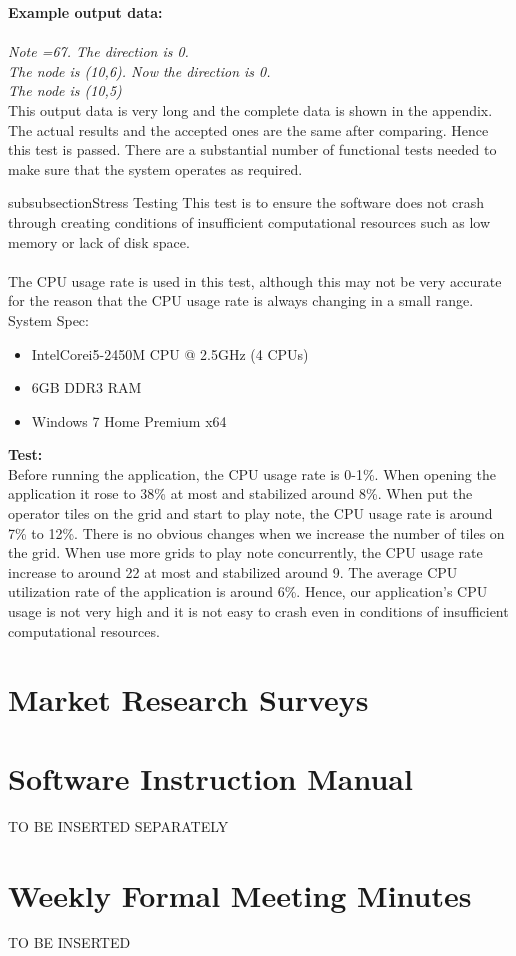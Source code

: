 \documentclass[10pt,a4paper]{article}
\begin{document}
\noindent
\textbf{Example output data:} \\
\\
\emph{ Note =67.  The direction is 0. \\ The node is (10,6).  Now the direction is 0. \\ The node is (10,5)}\\

\noindent
This output data is very long and the complete data is shown in the appendix. The actual results and the accepted ones are the same after comparing. Hence this test is passed. There are a substantial number of functional tests needed to make sure that the system operates as required. 

subsubsection{Stress Testing}
This test is to ensure the software does not crash through creating conditions of insufficient computational resources such as low memory or lack of disk space.\\
\\
The CPU usage rate is used in this test, although this may not be very accurate for the reason that the CPU usage rate is always changing in a small range.\\
\pagebreak
System Spec:
\begin{itemize}
\item Intel\textregistered Core\texttrademark i5-2450M CPU @ 2.5GHz (4 CPUs)
\item 6GB DDR3 RAM
\item Windows 7 Home Premium x64
\end{itemize}
\textbf{Test:} \\
Before running the application, the CPU usage rate is 0-1\%. When opening the application it rose to 38\% at most and stabilized around 8\%. When put the operator tiles on the grid and start to play note, the CPU usage rate is around 7\% to 12\%. There is no obvious changes when we increase the number of tiles on the grid. When use more grids to play note concurrently, the CPU usage rate increase to around 22 at most and stabilized around 9. The average CPU utilization rate of the application is around 6\%. Hence, our application's CPU usage is not very high and it is not easy to crash even in conditions of insufficient computational resources. 

\section{Market Research Surveys}

\pagebreak

\section{Software Instruction Manual}
TO BE INSERTED SEPARATELY

\pagebreak
\section{Weekly Formal Meeting Minutes}
TO BE INSERTED
\end{document}
